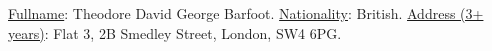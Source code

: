 %
%
%
\par{

\underline{Fullname}: Theodore David George Barfoot.
\underline{Nationality}: British.
\underline{Address (3+ years)}: Flat 3, 2B Smedley Street, London, SW4 6PG.



}



